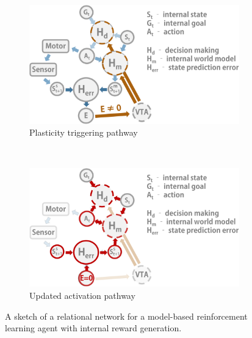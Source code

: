\begin{figure}[h!]
  \centering
     \begin{subfigure}{.9\textwidth}
    \includegraphics[width=\linewidth]{img/chapter5/Internal_reward_generation_in_a_relnet_a.png}
    \caption{Plasticity triggering pathway}
    \label{fig:forward_pass}
    \end{subfigure}\\
    \begin{subfigure}{.9\textwidth}
    \includegraphics[width=\linewidth]{img/chapter5/Internal_reward_generation_in_a_relnet_b.png}
    \caption{Updated activation pathway}
    \label{fig:return_pass}
  \end{subfigure}
  \centering
    \caption[Internal reward generation in a relational network]{A sketch of a relational network for a model-based reinforcement learning agent with internal reward generation.}
  \label{fig:internal_reward_generation_in_a_relnet}
\end{figure}


